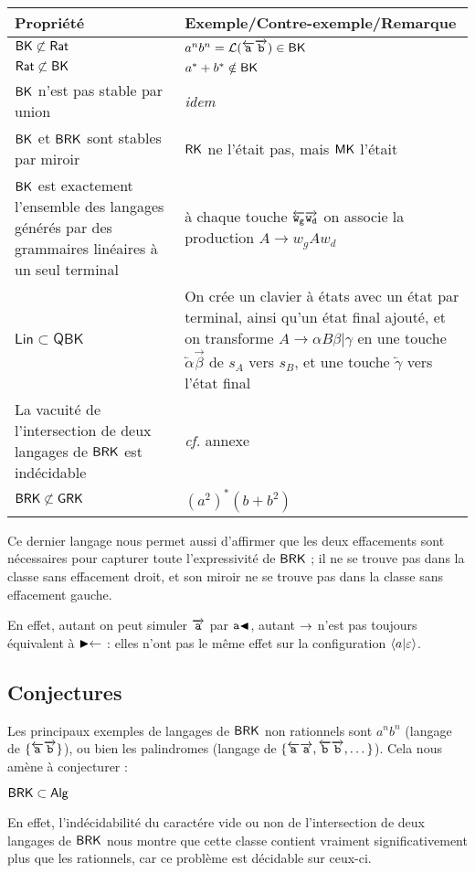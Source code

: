 \documentclass[12pt, a4paper]{article}
\renewcommand{\L}{\mathcal{L}}
\begin{document}
    \begin{tabular}{|p{}|p{}|}
        \hline
        \textbf{Propriété} & \textbf{Exemple/Contre-exemple/Remarque} \\
        \hline
        $\mathsf{BK} \not\subset \mathsf{Rat}$ & $a^nb^n = \L({\egauche{a}\edroite{b}}) \in \BK$ \\
        \hline
        $\mathsf{Rat} \not\subset \mathsf{BK}$ & $a^*+b^* \notin \mathsf{BK}$ \\
        \hline
        $\mathsf{BK}$ n'est pas stable par union & \textit{idem} \\
        \hline
        $\mathsf{BK}$ et $\mathsf{BRK}$ sont stables par miroir & $\mathsf{RK}$ ne l'était pas, mais $\mathsf{MK}$ l'était \\
        \hline
        $\mathsf{BK}$ est exactement l'ensemble des langages générés par des grammaires linéaires à un seul terminal & à chaque touche $\overleftarrow{\mathtt{w_g}}\overrightarrow{\mathtt{w_d}}$ on associe la production $A \rightarrow w_gAw_d$ \\
        \hline
        $\mathsf{Lin} \subset \mathsf{QBK}$ & On crée un clavier à états avec un état par terminal, ainsi qu'un état final ajouté, et on transforme $A \rightarrow \alpha B \beta | \gamma$ en une touche $\overleftarrow{\alpha}\overrightarrow{\beta}$ de $s_A$ vers $s_B$, et une touche $\overleftarrow{\gamma}$ vers l'état final \\
        \hline
        La vacuité de l'intersection de deux langages de $\mathsf{BRK}$ est indécidable & \textit{cf.} annexe \\
        \hline
        $\mathsf{BRK} \not\subset \mathsf{GRK}$ & $(a^2)^*(b+b^2)$ \\
        \hline
    \end{tabular}

    
    Ce dernier langage nous permet aussi d'affirmer que les deux effacements sont nécessaires pour capturer toute l'expressivité de $\mathsf{BRK}$ ; il ne se trouve pas dans la classe sans effacement droit, et son miroir ne se trouve pas dans la classe sans effacement gauche.

    En effet, autant on peut simuler $\overrightarrow{\mathtt{a}}$ par $\mathtt{a}\mathord{\blacktriangleleft}$, autant $\mathord{\rightarrow}$ n'est pas toujours équivalent à $\mathord{\blacktriangleright}\mathord{\leftarrow}$ : elles n'ont pas le même effet sur la configuration $\left\langle a \middle| \varepsilon \right\rangle$.
         
    \subsection{Conjectures}
    Les principaux exemples de langages de $\mathsf{BRK}$ non rationnels sont $a^nb^n$ (langage de $\{\overleftarrow{\mathtt{a}}\overrightarrow{\mathtt{b}}\}$), ou bien les palindromes (langage de $\{\overleftarrow{\mathtt{a}}\overrightarrow{\mathtt{a}},\overleftarrow{\mathtt{b}}\overrightarrow{\mathtt{b}}, \dots\}$). Cela nous amène à conjecturer :
    \begin{example}[Conjecture 1]
        $\mathsf{BRK} \subset \mathsf{Alg}$
    \end{example}
    En effet, l'indécidabilité du caractére vide ou non de l'intersection de deux langages de $\mathsf{BRK}$ nous montre que cette classe contient vraiment significativement plus que les rationnels, car ce problème est décidable sur ceux-ci.
    \clearpage
    \appendix
\end{document}
